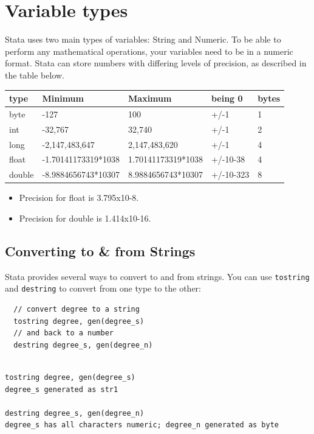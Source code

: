 \documentclass[]{book}
\providecommand{\tightlist}{%
  \setlength{\itemsep}{0pt}\setlength{\parskip}{0pt}}
\begin{document}
\hypertarget{variable-types}{%
\section{Variable types}\label{variable-types}}

Stata uses two main types of variables: String and Numeric. To be able to perform any mathematical operations, your variables need to be in a numeric format. Stata can store numbers with differing levels of precision, as described in the table below.

\begin{longtable}[]{@{}lllll@{}}
\toprule
type & Minimum & Maximum & being 0 & bytes\tabularnewline
\midrule
\endhead
byte & -127 & 100 & +/-1 & 1\tabularnewline
int & -32,767 & 32,740 & +/-1 & 2\tabularnewline
long & -2,147,483,647 & 2,147,483,620 & +/-1 & 4\tabularnewline
float & -1.70141173319*1038 & 1.70141173319*1038 & +/-10-38 & 4\tabularnewline
double & -8.9884656743*10307 & 8.9884656743*10307 & +/-10-323 & 8\tabularnewline
\bottomrule
\end{longtable}

\begin{itemize}
\tightlist
\item
  Precision for float is 3.795x10-8.
\item
  Precision for double is 1.414x10-16.
\end{itemize}

\hypertarget{converting-to-from-strings}{%
\subsection{Converting to \& from Strings}\label{converting-to-from-strings}}

Stata provides several ways to convert to and from strings. You can use \texttt{tostring} and \texttt{destring} to convert from one type to the other:

\begin{verbatim}
  // convert degree to a string
  tostring degree, gen(degree_s)
  // and back to a number
  destring degree_s, gen(degree_n)
\end{verbatim}

\begin{verbatim}

tostring degree, gen(degree_s)
degree_s generated as str1

destring degree_s, gen(degree_n)
degree_s has all characters numeric; degree_n generated as byte
\end{verbatim}
\end{document}
